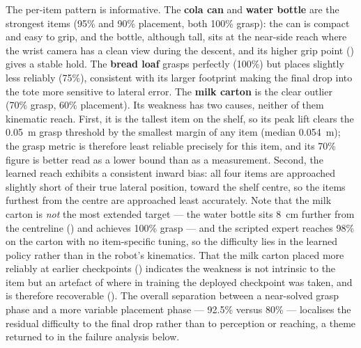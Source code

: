 The per-item pattern is informative. The \textbf{cola can} and \textbf{water
bottle} are the strongest items (95\% and 90\% placement, both 100\% grasp): the can
is compact and easy to grip, and the bottle, although tall, sits at the near-side
reach where the wrist camera has a clean view during the descent, and its higher grip
point () gives a stable hold. The \textbf{bread loaf} grasps
perfectly (100\%) but places slightly less reliably (75\%), consistent with its
larger footprint making the final drop into the tote more sensitive to lateral
error. The \textbf{milk carton} is the clear outlier (70\% grasp, 60\% placement).
Its weakness has two causes, neither of them kinematic reach. First, it is the tallest
item on the shelf, so its peak lift clears the \SI{0.05}{m} grasp threshold by the
smallest margin of any item (median \SI{0.054}{m}); the grasp metric is therefore
least reliable precisely for this item, and its 70\% figure is better read as a lower
bound than as a measurement. Second, the learned reach exhibits a consistent inward
bias: all four items are approached slightly short of their true lateral position,
toward the shelf centre, so the items furthest from the centre are approached least
accurately. Note that the milk carton is \emph{not} the most extended target --- the
water bottle sits \SI{8}{cm} further from the centreline () and
achieves 100\% grasp --- and the scripted expert reaches 98\% on the carton with no
item-specific tuning, so the difficulty lies in the learned policy rather than in the
robot's kinematics. That the
milk carton placed more reliably at earlier checkpoints ()
indicates the weakness is not intrinsic to the item but an artefact of where in
training the deployed checkpoint was taken, and is therefore recoverable
(). The overall separation between a near-solved grasp phase
and a more variable placement phase --- 92.5\% versus 80\% --- localises the residual
difficulty to the final drop rather than to perception or reaching, a theme returned
to in the failure analysis below.

